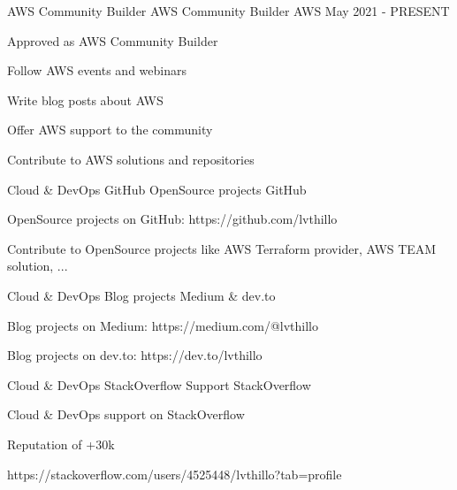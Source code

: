 

\begin{cventries}

  \cventry
    {AWS Community Builder} %
    {AWS Community Builder} %
    {AWS} %
    {May 2021 - PRESENT} %
    {
      \begin{cvitems} %
        \item {Approved as AWS Community Builder}
        \item {Follow AWS events and webinars}
        \item {Write blog posts about AWS}
        \item {Offer AWS support to the community}
        \item {Contribute to AWS solutions and repositories}
      \end{cvitems}
    }

  \cventry
    {Cloud \& DevOps} %
    {GitHub OpenSource projects} %
    {GitHub} %
    {} %
    {
      \begin{cvitems} %
        \item {OpenSource projects on GitHub: https://github.com/lvthillo}
        \item {Contribute to OpenSource projects like AWS Terraform provider, AWS TEAM solution, ...}
      \end{cvitems}
    }

  \cventry
    {Cloud \& DevOps} %
    {Blog projects} %
    {Medium \& dev.to} %
    {} %
    {
      \begin{cvitems} %
        \item {Blog projects on Medium: https://medium.com/@lvthillo}
        \item {Blog projects on dev.to: https://dev.to/lvthillo}
      \end{cvitems}
    }

  \cventry
    {Cloud \& DevOps} %
    {StackOverflow Support} %
    {StackOverflow} %
    {} %
    {
      \begin{cvitems} %
        \item {Cloud \& DevOps support on StackOverflow}
        \item {Reputation of +30k}
        \item {https://stackoverflow.com/users/4525448/lvthillo?tab=profile}
      \end{cvitems}
    }


\end{cventries}
